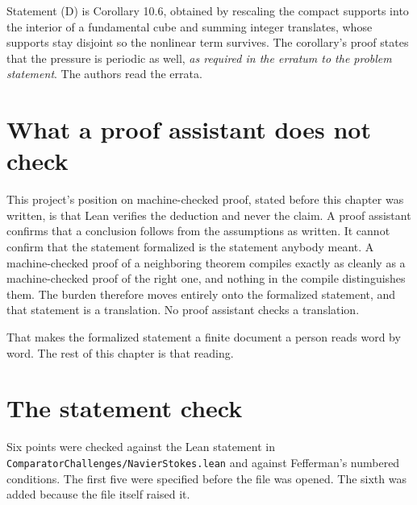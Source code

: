 Statement (D) is Corollary 10.6, obtained by rescaling the compact supports into the interior of a
fundamental cube and summing integer translates, whose supports stay disjoint so the nonlinear term
survives. The corollary's proof states that the pressure is periodic as well, \emph{as required in
the erratum to the problem statement}. The authors read the errata.

\section{What a proof assistant does not check}

This project's position on machine-checked proof, stated before this chapter was written, is that
Lean verifies the deduction and never the claim. A proof assistant confirms that a conclusion
follows from the assumptions as written. It cannot confirm that the statement formalized is the
statement anybody meant. A machine-checked proof of a neighboring theorem compiles exactly as
cleanly as a machine-checked proof of the right one, and nothing in the compile distinguishes them.
The burden therefore moves entirely onto the formalized statement, and that statement is a
translation. No proof assistant checks a translation.

That makes the formalized statement a finite document a person reads word by word. The rest of this
chapter is that reading.

\section{The statement check}

Six points were checked against the Lean statement in
\texttt{ComparatorChallenges/\allowbreak{}NavierStokes.\allowbreak{}lean} and against Fefferman's
numbered conditions. The first five were specified before the file was opened. The sixth was added
because the file itself raised it.

